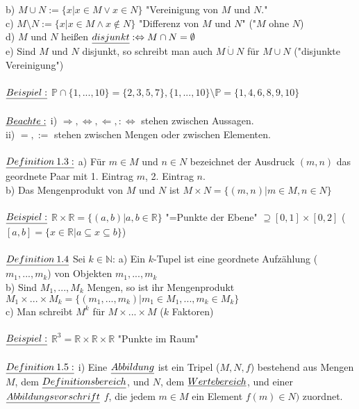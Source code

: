 \documentclass[fleqn, a4paper, 11pt]{article}
\begin{document}
b) $M\cup N:=\{x|x\in M\vee x\in N\}$ "Vereinigung von $M$ und $N$."\\
c) $M\setminus N:=\{x|x\in M\wedge x\notin N\}$ "Differenz von $M$ und $N$" ("$M$ ohne $N$)\\
d) $M$ und $N$ hei\ss{}en $\uline{disjunkt}:\Leftrightarrow M\cap N=\emptyset$\\
e) Sind $M$ und $N$ disjunkt, so schreibt man auch $M\mathbin{\dot{\cup}}N$ f\"ur $M\cup N$ ("disjunkte Vereinigung")\\
\\
$\uline{Beispiel:}$ $\mathbb{P}\cap\{1,...,10\}=\{2,3,5,7\},\{1,...,10\}\setminus\mathbb{P}=\{1,4,6,8,9,10\}$\\
\\
$\uline{Beachte:}$ i) $\Rightarrow,\Leftrightarrow,\Leftarrow,:\Leftrightarrow$ stehen zwischen Aussagen.\\
ii) $=,:=$ stehen zwischen Mengen oder zwischen Elementen.\\
\\
$\uline{Definition\:1.3:}$ a) F\"ur $m\in M$ und $n\in N$ bezeichnet der Ausdruck $(m,n)$ das geordnete Paar mit 1. Eintrag $m$, 2. Eintrag $n$.\\
b) Das Mengenprodukt von $M$ und $N$ ist $M\times N=\{(m,n)|m\in M,n\in N\}$\\
\\
$\uline{Beispiel:}$ $\mathbb{R}\times\mathbb{R}=\{(a,b)|a,b\in\mathbb{R}\}$ "=Punkte der Ebene" $\supseteq[0,1]\times[0,2]$ ($[a,b]=\{x\in\mathbb{R}|a\subseteq x\subseteq b\}$)\\
\\
$\uline{Definition\:1.4}$ Sei $k\in\mathbb{N}$: a) Ein $k$-Tupel ist eine geordnete Aufz\"ahlung ($m_{1},...,m_{k}$) von Objekten $m_{1},...,m_{k}$\\
b) Sind $M_{1},...,M_{k}$ Mengen, so ist ihr Mengenprodukt $M_{1}\times...\times M_{k}=\{(m_{1},...,m_{k})|m_{1}\in M_{1},...,m_{k}\in M_{k}\}$\\
c) Man schreibt $M^{k}$ f\"ur $M\times...\times M$ ($k$ Faktoren)\\
\\
$\uline{Beispiel:}$ $\mathbb{R}^{3}=\mathbb{R}\times\mathbb{R}\times\mathbb{R}$ "Punkte im Raum"\\
\\
$\uline{Definition\:1.5:}$ i) Eine $\uline{Abbildung}$ ist ein Tripel ($M,N,f$) bestehend aus Mengen $M$, dem $\uline{Definitionsbereich}$, und $N$, dem $\uline{Wertebereich}$, und einer $\uline{Abbildungsvorschrift}$ $f$, die jedem $m\in M$ ein Element $f(m)\in N)$ zuordnet.\\
\end{document}
